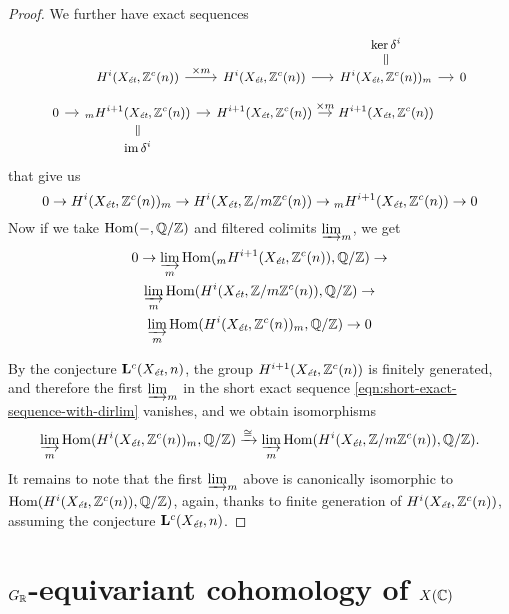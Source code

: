 \documentclass{article}
\numberwithin{equation}{section}
\begin{document}
\begin{proposition}
\begin{proof}
    We further have exact sequences
    \[ \begin{tikzcd}[row sep=0.8em,column sep=1em,font=\small]
      & & & \ker \delta^i\ar[equal]{d} \\
      & H^i (X_\et, \ZZ^c (n)) \ar{r}{\times m} & H^i (X_\et, \ZZ^c (n))\ar{r} & H^i (X_\et, \ZZ^c (n))_m \ar{r} & 0 \\
      0\ar{r} & {}_m H^{i+1} (X_\et, \ZZ^c (n)) \ar{r} & H^{i+1} (X_\et, \ZZ^c (n))\ar{r}{\times m} & H^{i+1} (X_\et, \ZZ^c (n)) \\
      & \im \delta^i\ar[equal]{u}
    \end{tikzcd} \]
    that give us
    \[ 0 \to H^i (X_\et, \ZZ^c (n))_m \to
    H^i (X_\et, \ZZ/m\ZZ^c (n)) \to
    {}_m H^{i+1} (X_\et, \ZZ^c (n)) \to 0 \]
    Now if we take $\Hom (-,\QQ/\ZZ)$ and filtered colimits $\varinjlim_m$,
    we get
    \begin{multline}
      \label{eqn:short-exact-sequence-with-dirlim}
      0 \to \varinjlim_m \Hom ({}_m H^{i+1} (X_\et, \ZZ^c (n)), \QQ/\ZZ) \to \\
      \varinjlim_m \Hom (H^i (X_\et, \ZZ/m\ZZ^c (n)), \QQ/\ZZ) \to \\
      \varinjlim_m \Hom (H^i (X_\et, \ZZ^c (n))_m, \QQ/\ZZ) \to 0
    \end{multline}

    By the conjecture $\mathbf{L}^c (X_\et, n)$, the group
    $H^{i+1} (X_\et, \ZZ^c (n))$ is finitely generated, and therefore
    the first $\varinjlim_m$ in the short exact sequence
    \eqref{eqn:short-exact-sequence-with-dirlim} vanishes, and we obtain
    isomorphisms
    \[ \varinjlim_m \Hom (H^i (X_\et, \ZZ^c (n))_m, \QQ/\ZZ) \xrightarrow{\cong}
    \varinjlim_m \Hom (H^i (X_\et, \ZZ/m\ZZ^c (n)), \QQ/\ZZ). \]
    It remains to note that the first $\varinjlim_m$ above is canonically
    isomorphic to $\Hom (H^i (X_\et, \ZZ^c (n)), \QQ/\ZZ)$, again,
    thanks to finite generation of $H^i (X_\et, \ZZ^c (n))$,
    assuming the conjecture $\mathbf{L}^c (X_\et, n)$.
  \end{proof}
\end{proposition}


\section{$G_\RR$-equivariant cohomology of $X (\CC)$}
\label{sec:GR-equivariant-cohomology}
\end{document}
